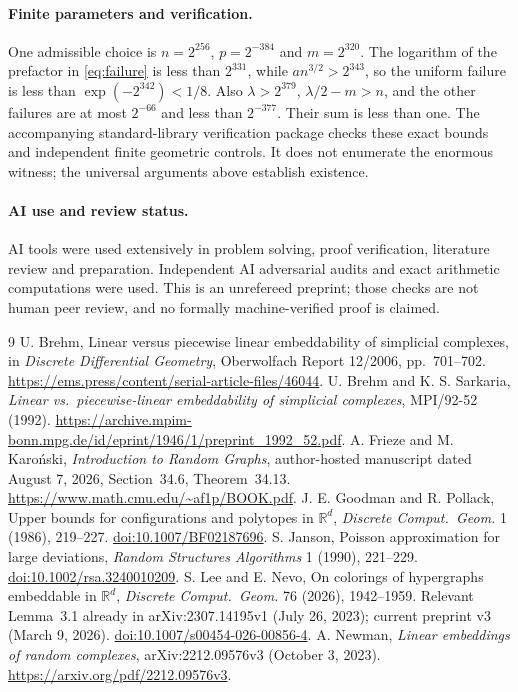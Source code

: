 \documentclass[11pt]{article}
\newcommand{\R}{\mathbb R}
\begin{document}
\paragraph{Finite parameters and verification.}
One admissible choice is
$n=2^{256}$, $p=2^{-384}$ and $m=2^{320}$.
The logarithm of the prefactor in \eqref{eq:failure} is less than
$2^{331}$, while $a n^{3/2}>2^{343}$, so the uniform failure is
less than $\exp(-2^{342})<1/8$.
Also $\lambda>2^{379}$, $\lambda/2-m>n$, and the other failures are
at most $2^{-66}$ and less than $2^{-377}$.
Their sum is less than one. The accompanying standard-library
verification package checks these exact bounds and independent
finite geometric controls. It does not enumerate the enormous
witness; the universal arguments above establish existence.

\paragraph{AI use and review status.}
AI tools were used extensively in problem solving, proof verification,
literature review and preparation. Independent AI adversarial audits
and exact arithmetic computations were used. This is an unrefereed
preprint; those checks are not human peer review, and no formally
machine-verified proof is claimed.

\begin{thebibliography}{9}
U. Brehm, Linear versus piecewise linear embeddability of simplicial
complexes, in \emph{Discrete Differential Geometry}, Oberwolfach
Report 12/2006, pp.~701--702.
\url{https://ems.press/content/serial-article-files/46044}.
U. Brehm and K. S. Sarkaria, \emph{Linear vs.\ piecewise-linear
embeddability of simplicial complexes}, MPI/92-52 (1992).
\url{https://archive.mpim-bonn.mpg.de/id/eprint/1946/1/preprint_1992_52.pdf}.
A. Frieze and M. Karo\'nski, \emph{Introduction to Random Graphs},
author-hosted manuscript dated August 7, 2026,
Section~34.6, Theorem~34.13.
\url{https://www.math.cmu.edu/~af1p/BOOK.pdf}.
J. E. Goodman and R. Pollack, Upper bounds for configurations and
polytopes in $\R^d$, \emph{Discrete Comput.\ Geom.} 1 (1986), 219--227.
\href{https://doi.org/10.1007/BF02187696}{doi:10.1007/BF02187696}.
S. Janson, Poisson approximation for large deviations,
\emph{Random Structures Algorithms} 1 (1990), 221--229.
\href{https://doi.org/10.1002/rsa.3240010209}{doi:10.1002/rsa.3240010209}.
S. Lee and E. Nevo, On colorings of hypergraphs embeddable in $\R^d$,
\emph{Discrete Comput.\ Geom.} 76 (2026), 1942--1959.
Relevant Lemma~3.1 already in arXiv:2307.14195v1 (July 26, 2023);
current preprint v3 (March 9, 2026).
\href{https://doi.org/10.1007/s00454-026-00856-4}{doi:10.1007/s00454-026-00856-4}.
A. Newman, \emph{Linear embeddings of random complexes},
arXiv:2212.09576v3 (October 3, 2023).
\url{https://arxiv.org/pdf/2212.09576v3}.
\end{thebibliography}
\end{document}
